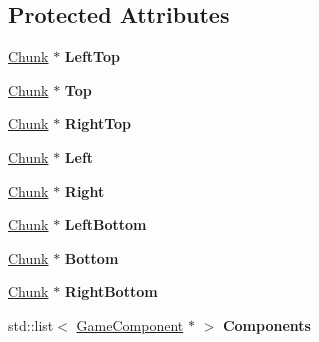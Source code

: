 \subsection*{Protected Attributes}
\begin{DoxyCompactItemize}
\item 
\hypertarget{class_chunk_a877d51226eaa97c40c05223987514d59}{\hyperlink{class_chunk}{Chunk} $\ast$ {\bfseries Left\-Top}}\label{class_chunk_a877d51226eaa97c40c05223987514d59}

\item 
\hypertarget{class_chunk_ae841d5ab24dfa5ef8865cb4fa05d089d}{\hyperlink{class_chunk}{Chunk} $\ast$ {\bfseries Top}}\label{class_chunk_ae841d5ab24dfa5ef8865cb4fa05d089d}

\item 
\hypertarget{class_chunk_a8a7593c89d4fe5ed193e68b9ed40016b}{\hyperlink{class_chunk}{Chunk} $\ast$ {\bfseries Right\-Top}}\label{class_chunk_a8a7593c89d4fe5ed193e68b9ed40016b}

\item 
\hypertarget{class_chunk_aee27c2584364a58dc8811e9ada0695dd}{\hyperlink{class_chunk}{Chunk} $\ast$ {\bfseries Left}}\label{class_chunk_aee27c2584364a58dc8811e9ada0695dd}

\item 
\hypertarget{class_chunk_a0bcf134e2aba0ca49370272c2b3f17a4}{\hyperlink{class_chunk}{Chunk} $\ast$ {\bfseries Right}}\label{class_chunk_a0bcf134e2aba0ca49370272c2b3f17a4}

\item 
\hypertarget{class_chunk_af3577f37139ffeb74181d9ce3c48f5e6}{\hyperlink{class_chunk}{Chunk} $\ast$ {\bfseries Left\-Bottom}}\label{class_chunk_af3577f37139ffeb74181d9ce3c48f5e6}

\item 
\hypertarget{class_chunk_ac9ac53a727ae045b6f751ec6a68bcaca}{\hyperlink{class_chunk}{Chunk} $\ast$ {\bfseries Bottom}}\label{class_chunk_ac9ac53a727ae045b6f751ec6a68bcaca}

\item 
\hypertarget{class_chunk_afded01a9a67540c9f64dde5776021f4b}{\hyperlink{class_chunk}{Chunk} $\ast$ {\bfseries Right\-Bottom}}\label{class_chunk_afded01a9a67540c9f64dde5776021f4b}

\item 
\hypertarget{class_chunk_a4cdf6febd96ff99b681e37d548617a38}{std\-::list$<$ \hyperlink{class_game_component}{Game\-Component} $\ast$ $>$ {\bfseries Components}}\label{class_chunk_a4cdf6febd96ff99b681e37d548617a38}


\end{DoxyCompactItemize}
